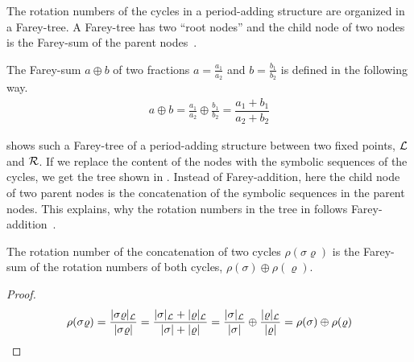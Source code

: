 The rotation numbers of the cycles in a period-adding structure are organized in a Farey-tree.
A Farey-tree has two ``root nodes'' and the child node of two nodes is the Farey-sum of the parent nodes~\cite{granados14adding}.

\begin{definition}
	The Farey-sum $a \oplus b$ of two fractions $a = \frac{a_1}{a_2}$ and $b = \frac{b_1}{b_2}$ is defined in the following way.
	\begin{align}
		a \oplus b = \frac{a_1}{a_2} \oplus \frac{b_1}{b_2} = \dfrac{a_1 + b_1}{a_2 + b_2}
	\end{align}
\end{definition}

 shows such a Farey-tree of a period-adding structure between two fixed points, $\mathcal{L}$ and $\mathcal{R}$.
If we replace the content of the nodes with the symbolic sequences of the cycles, we get the tree shown in .
Instead of Farey-addition, here the child node of two parent nodes is the concatenation of the symbolic sequences in the parent nodes.
This explains, why the rotation numbers in the tree in  follows Farey-addition~\cite{granados14adding}.

\begin{theorem}
	The rotation number of the concatenation of two cycles $\rho(\sigma\varrho)$ is the Farey-sum of the rotation numbers of both cycles, $\rho(\sigma) \oplus \rho(\varrho)$.
\end{theorem}

\begin{proof}
	\begin{align*}
		\rho(\sigma\varrho)
		= \dfrac{|\sigma\varrho|_{\mathcal{L}}}{|\sigma\varrho|}
		= \dfrac{|\sigma|_{\mathcal{L}} + |\varrho|_{\mathcal{L}}}{|\sigma| + |\varrho|}
		= \dfrac{|\sigma|_{\mathcal{L}}}{|\sigma|} \oplus \dfrac{|\varrho|_{\mathcal{L}}}{|\varrho|}
		= \rho(\sigma) \oplus \rho(\varrho)
	\end{align*}
\end{proof}


